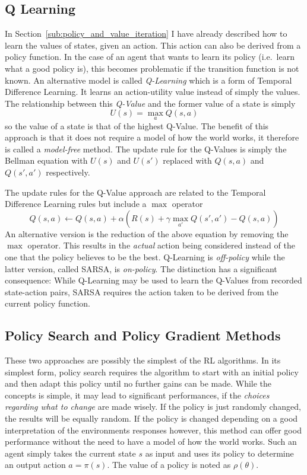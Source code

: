 \subsection{Q Learning}%
\label{sub:q_learning}

In Section~\ref{sub:policy_and_value_iteration} I have already described how to learn the values of states, given an
action. This action can also be derived from a policy function.  In the case of an agent that wants to learn its policy
(i.e.\ learn what a good policy is), this becomes problematic if the transition function is not known. An alternative
model is called \emph{Q-Learning} which is a form of Temporal Difference Learning. It learns an action-utility value
instead of simply the values. The relationship between this \emph{Q-Value} and the former value of a state is simply
\begin{equation}
    U(s) = \max_{a}Q(s,a)
\end{equation}
so the value of a state is that of the highest Q-Value. The benefit of this approach is that it does not require a model
of how the world works, it therefore is called a \emph{model-free} method. The update rule for the Q-Values is simply
the Bellman equation with $U(s)$ and $U(s')$ replaced with $Q(s,a)$ and $Q(s',a')$ respectively.

The update rules for the Q-Value approach are related to the Temporal Difference Learning rules but include a $\max$
operator
\begin{equation}
    Q(s,a) \gets Q(s,a) + \alpha(R(s) + \gamma \max_{a'}Q(s', a') - Q(s,a))
\end{equation}
An alternative version is the reduction of the above equation by removing the $\max$ operator. This results in the
\emph{actual} action being considered instead of the one that the policy believes to be the best. Q-Learning is
\emph{off-policy} while the latter version, called \ac{SARSA}, is \emph{on-policy}. The distinction has a significant
consequence: While Q-Learning may be used to learn the Q-Values from recorded state-action pairs, \ac{SARSA} requires
the action taken to be derived from the current policy function.

\subsection{Policy Search and Policy Gradient Methods}%
\label{sub:policy_search_and_policy_gradient_methods}

These two approaches are possibly the simplest of the \ac{RL} algorithms. In its simplest form, policy search requires
the algorithm to start with an initial policy and then adapt this policy until no further gains can be made. While the
concepts is simple, it may lead to significant performances, if the \emph{choices regarding what to change} are made
wisely. If the policy is just randomly changed, the results will be equally random. If the policy is changed depending
on a good interpretation of the environments responses however, this method can offer good performance without the need
to have a model of how the world works. Such an agent simply takes the current state $s$ as input and uses its policy to
determine an output action $a = \pi(s)$. The value of a policy is noted as $\rho(\theta)$.

